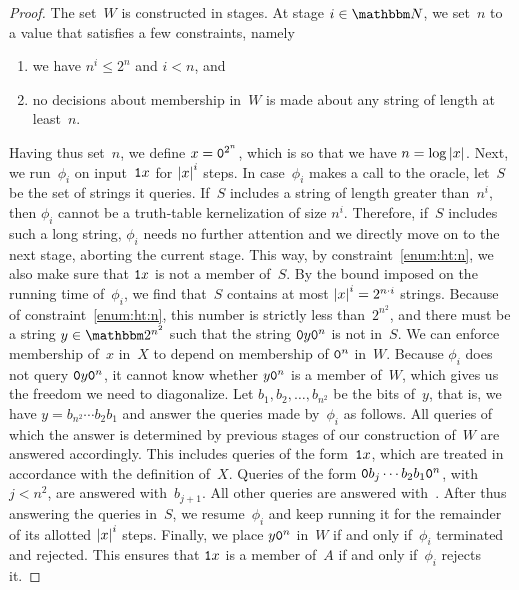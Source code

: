 \begin{proof}
  The set~$W$ is constructed in stages.
  At stage $i \in \bbN$, we set~$n$ to a value that satisfies a few constraints, namely
  \begin{enumerate}
  \item\label{enum:ht:n}
    we have $n^i \le 2^n$ and $i < n$, and
  \item
    no decisions about membership in~$W$ is made about any string of length at least~$n$.
  \end{enumerate}
  Having thus set~$n$, we define $x = \textnormal{\texttt{0}}^{2^n}$, which is so that we have $n = \log{\lvert x\rvert}$.
  Next, we run~$\phi_i$ on input~$\textnormal{\texttt{1}}x$ for ${\lvert x\rvert}^i$ steps.
  In case~$\phi_i$ makes a call to the oracle, let~$S$ be the set of strings it queries.
  If~$S$ includes a string of length greater than~$n^i$, then $\phi_i$ cannot be a truth-table kernelization of size $n^i$.
  Therefore, if~$S$ includes such a long string, $\phi_i$ needs no further attention and we directly move on to the next stage, aborting the current stage.
  This way, by constraint~\ref{enum:ht:n}, we also make sure that $\textnormal{\texttt{1}}x$ is not a member of~$S$.
  By the bound imposed on the running time of~$\phi_i$, we find that~$S$ contains at most ${\lvert x\rvert}^i = 2^{n \cdot i}$ strings.
  Because of constraint~\ref{enum:ht:n}, this number is strictly less than~$2^{n^2}$, and there must be a string $y \in \binary^{n^2}$ such that the string $\textnormal{\texttt{0}}y\textnormal{\texttt{0}}^n$ is not in~$S$.
  We can enforce membership of~$x$ in~$X$ to depend on membership of $\textnormal{\texttt{0}}^n$ in~$W$.
  Because $\phi_i$ does not query $\textnormal{\texttt{0}}y\textnormal{\texttt{0}}^n$, it cannot know whether $y\textnormal{\texttt{0}}^n$ is a member of~$W$, which gives us the freedom we need to diagonalize.
  Let $b_1, b_2, \ldots, b_{n^2}$ be the bits of~$y$, that is, we have $y = b_{n^2}\cdots b_2b_1$ and answer the queries made by~$\phi_i$ as follows.
  All queries of which the answer is determined by previous stages of our construction of~$W$ are answered accordingly.
  This includes queries of the form~$\textnormal{\texttt{1}}x$, which are treated in accordance with the definition of~$X$.
  Queries of the form $\textnormal{\texttt{0}}b_j\cdots b_2b_1\textnormal{\texttt{0}}^n$, with $j < n^2$, are answered with~$b_{j + 1}$.
  All other queries are answered with~.
  After thus answering the queries in~$S$, we resume~$\phi_i$ and keep running it for the remainder of its allotted ${\lvert x\rvert}^i$ steps.
  Finally, we place $y\textnormal{\texttt{0}}^n$ in~$W$ if and only if~$\phi_i$ terminated and rejected.
  This ensures that $\textnormal{\texttt{1}}x$ is a member of~$A$ if and only if~$\phi_i$ rejects it.


\end{proof}
